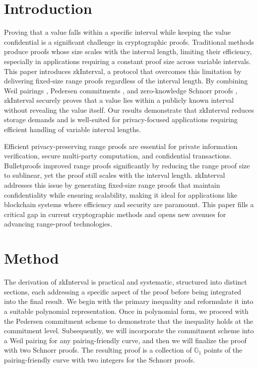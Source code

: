 \documentclass[version=preprint]{iacrcc}
\begin{document}
\section{Introduction}

Proving that a value falls within a specific interval while keeping the value confidential is a significant challenge in cryptographic proofs. Traditional methods produce proofs whose size scales with the interval length, limiting their efficiency, especially in applications requiring a constant proof size across variable intervals. This paper introduces zkInterval, a protocol that overcomes this limitation by delivering fixed-size range proofs regardless of the interval length. By combining Weil pairings \cite{menezes93}, Pedersen commitments \cite{pc92}, and zero-knowledge Schnorr proofs \cite{zero20}, zkInterval securely proves that a value lies within a publicly known interval without revealing the value itself. Our results demonstrate that zkInterval reduces storage demands and is well-suited for privacy-focused applications requiring efficient handling of variable interval lengths.

Efficient privacy-preserving range proofs are essential for private information verification, secure multi-party computation, and confidential transactions. Bulletproofs \cite{bbb18} improved range proofs significantly by reducing the range proof size to sublinear, yet the proof still scales with the interval length. zkInterval addresses this issue by generating fixed-size range proofs that maintain confidentiality while ensuring scalability, making it ideal for applications like blockchain systems where efficiency and security are paramount. This paper fills a critical gap in current cryptographic methods and opens new avenues for advancing range-proof technologies.

\section{Method}

The derivation of zkInterval is practical and systematic, structured into distinct sections, each addressing a specific aspect of the proof before being integrated into the final result. We begin with the primary inequality and reformulate it into a suitable polynomial representation. Once in polynomial form, we proceed with the Pedersen commitment scheme to demonstrate that the inequality holds at the commitment level. Subsequently, we will incorporate the commitment scheme into a Weil pairing for any pairing-friendly curve, and then we will finalize the proof with two Schnorr proofs. The resulting proof is a collection of \(\mathbb{G}_{1}\) points of the pairing-friendly curve with two integers for the Schnorr proofs.
\end{document}
